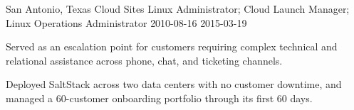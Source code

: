 \begin{role}
{\companyrackspace}
{San Antonio, Texas}
{Cloud Sites Linux Administrator; Cloud Launch Manager; Linux Operations Administrator}
{2010-08-16}
{2015-03-19}
    \item Served as an escalation point for customers requiring complex technical and relational assistance across phone, chat, and ticketing channels.
    \item Deployed SaltStack across two data centers with no customer downtime, and managed a 60-customer onboarding portfolio through its first 60 days.
\end{role}
